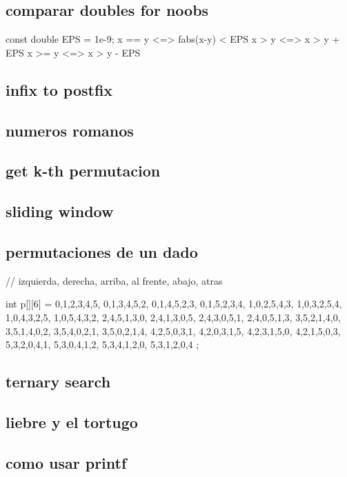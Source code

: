\subsection{comparar doubles for noobs}
\begin{code}
const double EPS = 1e-9;
x == y	<=> fabs(x-y) < EPS
x >  y	<=> x > y + EPS
x >= y	<=> x > y - EPS
\end{code}
\subsection{infix to postfix}
\subsection{numeros romanos}
\subsection{get k-th permutacion}
\subsection{sliding window}
\subsection{permutaciones de un dado}
\begin{code}
// izquierda, derecha, arriba, al frente, abajo, atras

int p[][6] = {
    {0,1,2,3,4,5},
    {0,1,3,4,5,2},
    {0,1,4,5,2,3},
    {0,1,5,2,3,4},
    {1,0,2,5,4,3},
    {1,0,3,2,5,4},
    {1,0,4,3,2,5},
    {1,0,5,4,3,2},
    {2,4,5,1,3,0},
    {2,4,1,3,0,5},
    {2,4,3,0,5,1},
    {2,4,0,5,1,3},
    {3,5,2,1,4,0},
    {3,5,1,4,0,2},
    {3,5,4,0,2,1},
    {3,5,0,2,1,4},
    {4,2,5,0,3,1},
    {4,2,0,3,1,5},
    {4,2,3,1,5,0},
    {4,2,1,5,0,3},
    {5,3,2,0,4,1},
    {5,3,0,4,1,2},
    {5,3,4,1,2,0},
    {5,3,1,2,0,4}
};
\end{code}
\subsection{ternary search}
\subsection{liebre y el tortugo}
\subsection{como usar printf}
